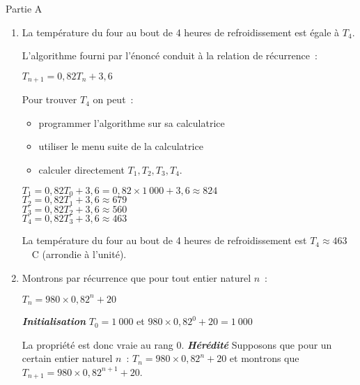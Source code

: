 \begin{corrige}
     \begin{center}\begin{h3}Partie A \end{h3}\end{center}
     \begin{enumerate}
          \item La température du four au bout de 4 heures de
          refroidissement est égale à $T_4$.
          \par
          L'algorithme fourni par l'énoncé conduit à la relation de récurrence~:
          \begin{center}$T_{n+1}=0,82T_n+3,6 $\end{center}
          Pour trouver $T_4$ on peut~:
          \begin{itemize}[label=---]
               \item %
               programmer l'algorithme sur sa calculatrice
               \item %
               utiliser le menu suite de la calculatrice
               \item %
               calculer directement $T_1, T_2, T_3, T_4$.
          \end{itemize}
          $T_1=0,82 T_0 + 3,6 $\nosp$= 0,82 \times 1\ 000+3,6$\nosp$ \approx 824$\\
          $T_2=0,82 T_1 + 3,6 \approx 679$\\
          $T_3=0,82 T_2 + 3,6 \approx 560$\\
          $T_4=0,82 T_3 + 3,6 \approx 463$
          \par
          La température du four au bout de 4 heures de
          refroidissement est $T_4\approx 463$~\degres~C (arrondie à l'unité).
          \item
          Montrons par récurrence que pour tout entier naturel $n$~:
          \begin{center}$ T_n=980 \times 0,82^n + 20 $\end{center}
          \smallskip
          \textbf{\textit{Initialisation}}
          \smallskip
          $T_0=1~000$ et $980 \times 0,82^0+20=1~000$\\
          \par
          La propriété est donc vraie au rang 0.
          \smallskip
          \textbf{\textit{Hérédité}}
          \smallskip
          Supposons que pour un certain entier naturel $n$~: $T_n=980 \times 0,82^n + 20$ et montrons que $T_{n+1} = 980 \times 0,82^{n+1} + 20 $.\\

\end{enumerate}
\end{corrige}
